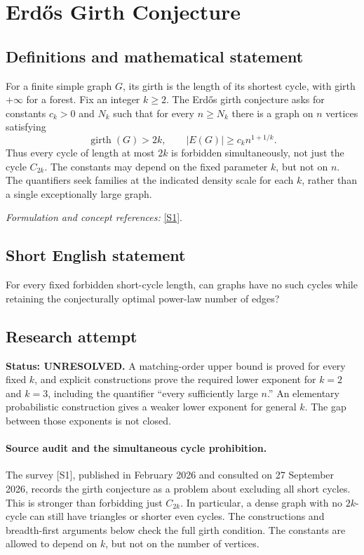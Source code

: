 \documentclass[11pt]{article}
\begin{document}
\section*{\texorpdfstring{Erdős Girth Conjecture}{Erdős Girth Conjecture}}\label{30006856}
\subsection{Definitions and mathematical statement}
For a finite simple graph $G$, its girth is the length of its shortest cycle, with girth $+\infty$ for a forest. Fix an integer $k\ge2$. The Erd\H{o}s girth conjecture asks for constants $c_k>0$ and $N_k$ such that for every $n\ge N_k$ there is a graph on $n$ vertices satisfying
\[
 \operatorname{girth}(G)>2k,
 \qquad |E(G)|\ge c_k n^{1+1/k}.
\]
Thus every cycle of length at most $2k$ is forbidden simultaneously, not just the cycle $C_{2k}$. The constants may depend on the fixed parameter $k$, but not on $n$. The quantifiers seek families at the indicated density scale for each $k$, rather than a single exceptionally large graph.
\par\smallskip\textit{Formulation and concept references:} \href{https://www.combinatorics.org/ojs/index.php/eljc/article/download/ds27/pdf}{[S1]}.

\subsection{Short English statement}
For every fixed forbidden short-cycle length, can graphs have no such cycles while retaining the conjecturally optimal power-law number of edges?
\subsection{Research attempt}
\textbf{Status: UNRESOLVED.} A matching-order upper bound is proved for every fixed $k$, and explicit constructions prove the required lower exponent for $k=2$ and $k=3$, including the quantifier ``every sufficiently large $n$.'' An elementary probabilistic construction gives a weaker lower exponent for general $k$. The gap between those exponents is not closed.

\paragraph{Source audit and the simultaneous cycle prohibition.}
The survey [S1], published in February 2026 and consulted on 27 September 2026, records the girth conjecture as a problem about excluding all short cycles. This is stronger than forbidding just $C_{2k}$. In particular, a dense graph with no $2k$-cycle can still have triangles or shorter even cycles. The constructions and breadth-first arguments below check the full girth condition. The constants are allowed to depend on $k$, but not on the number of vertices.
\end{document}
